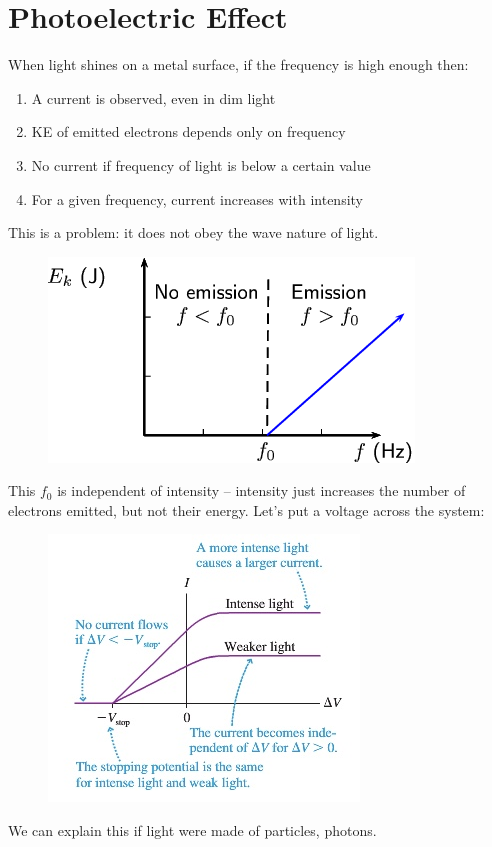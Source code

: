 \documentclass[a4paper, 11pt, normalem]{report}
\begin{document}
\section{Photoelectric Effect}
When light shines on a metal surface, if the frequency is high enough then:
\begin{enumerate}
    \item A current is observed, even in dim light
    \item KE of emitted electrons depends only on frequency
    \item No current if frequency of light is below a certain value
    \item For a given frequency, current increases with intensity
\end{enumerate}
This is a problem: it does not obey the wave nature of light.
\begin{figure}[H]
    \centering
    \includegraphics[scale=0.7]{Photoelec.png}
\end{figure}
This $f_{0}$ is independent of intensity -- intensity just increases the number of electrons emitted, but not their energy.
Let's put a voltage across the system:
\begin{figure}[H]
    \centering
    \includegraphics{currentvsvoltage.jpg}
\end{figure}
We can explain this if light were made of particles, photons.
\end{document}
